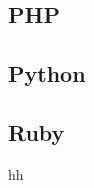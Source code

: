 \documentclass{KodeBook}
\begin{document}
\subsection{PHP}


\subsection{Python}


\subsection{Ruby}

hh




\ifx\wholebook\relax\else
% 
% 
	
\end{document}

